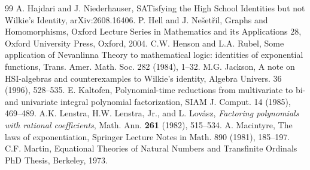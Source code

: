 \documentclass[eqnor,reqno]{amsart}
\theoremstyle{plain}
\theoremstyle{definition}
\begin{document}
\begin{thebibliography}{99}
 A. Hajdari and  J. Niederhauser, SATisfying the High School Identities but not Wilkie's Identity, arXiv:2608.16406.
 P. Hell and J. Ne{\v{s}}et{\v{r}}il, Graphs and Homomorphisms, Oxford Lecture Series in Mathematics and its Applications 28, Oxford University Press, Oxford, 2004.
 C.W. Henson and L.A. Rubel, Some application of Nevanlinna Theory to mathematical logic: identities of exponential
functions, Trans. Amer. Math. Soc. 282 (1984), 1--32.
 M.G. Jackson, A note on HSI-algebras and counterexamples to Wilkie's identity, Algebra Univers. 36 (1996),  528--535.
 E. Kaltofen, Polynomial-time reductions from multivariate to bi- and univariate integral polynomial factorization, SIAM J. Comput. 14 (1985), 469--489.
 A.K. Lenstra, H.W. Lenstra, Jr., and L. Lov\'{a}sz, \emph{Factoring polynomials with rational coefficients}, Math. Ann. {\bf 261} (1982), 515--534.
 A. Macintyre, The laws of exponentiation, Springer Lecture Notes in Math. 890 (1981), 185--197.
%
%
 C.F. Martin, Equational Theories of Natural Numbers and Transfinite Ordinals PhD Thesis, Berkeley, 1973.

\end{thebibliography}
\end{document}
